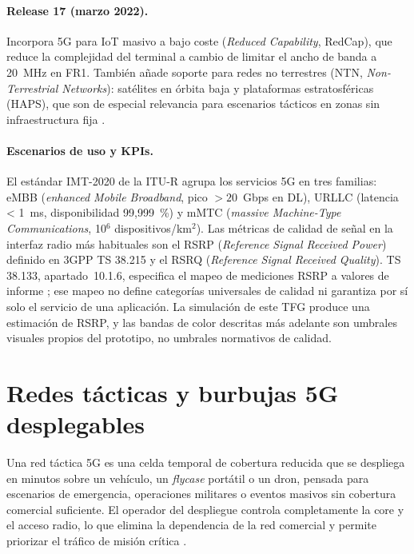 \paragraph{Release 17 (marzo 2022).} Incorpora 5G para IoT masivo a bajo coste
(\textit{Reduced Capability}, RedCap), que reduce la complejidad del terminal a cambio de
limitar el ancho de banda a 20~MHz en FR1. También añade soporte para redes no terrestres
(NTN, \textit{Non-Terrestrial Networks}): satélites en órbita baja y plataformas
estratosféricas (HAPS), que son de especial relevancia para escenarios tácticos en zonas
sin infraestructura fija \cite{3gpp_rel17_2022}.

\paragraph{Escenarios de uso y KPIs.} El estándar IMT-2020 de la ITU-R agrupa los servicios
5G en tres familias: eMBB (\textit{enhanced Mobile Broadband}, pico $> 20$~Gbps en DL),
URLLC (latencia < 1~ms, disponibilidad 99,999~\%) y mMTC (\textit{massive Machine-Type
Communications}, 10$^6$ dispositivos/km$^2$). Las métricas de calidad de señal en la
interfaz radio más habituales son el RSRP (\textit{Reference Signal Received Power})
definido en 3GPP TS 38.215 \cite{3gpp_ts38215_2022} y el RSRQ (\textit{Reference Signal
Received Quality}). TS 38.133,
apartado~10.1.6, especifica el mapeo de mediciones RSRP a valores de informe
\cite{etsi_ts138133_v153400_2026}; ese mapeo no define categorías universales de calidad
ni garantiza por sí solo el servicio de una aplicación. La simulación de este TFG produce
una estimación de RSRP, y las bandas de color descritas más adelante son umbrales visuales
propios del prototipo, no umbrales normativos de calidad.

\section{Redes tácticas y burbujas 5G desplegables}
\label{sec:burbujas}

Una red táctica 5G es una celda temporal de cobertura reducida que se despliega en minutos
sobre un vehículo, un \textit{flycase} portátil o un dron, pensada para escenarios de
emergencia, operaciones militares o eventos masivos sin cobertura comercial suficiente.
El operador del despliegue controla completamente la core y el acceso radio, lo que elimina
la dependencia de la red comercial y permite priorizar el tráfico de misión crítica
\cite{camp2020tactical5g}.

